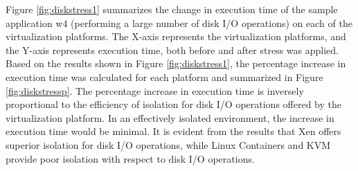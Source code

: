 Figure \ref{fig:diskstress1} summarizes the change in execution time of the sample application w4 (performing a large number of disk I/O operations) on each of the virtualization platforms. The X-axis represents the virtualization platforms, and the Y-axis represents execution time, both before and after stress was applied. Based on the results shown in Figure \ref{fig:diskstress1}, the percentage increase in execution time was calculated for each platform and summarized in Figure \ref{fig:diskstressp}. The percentage increase in execution time is inversely proportional to the  efficiency of isolation for disk I/O operations offered by the virtualization platform. In an effectively isolated environment, the increase in execution time would be minimal. It is evident from the results that Xen offers superior isolation for disk I/O operations, while Linux Containers and KVM provide poor isolation with respect to disk I/O operations.


%
%
%
%




